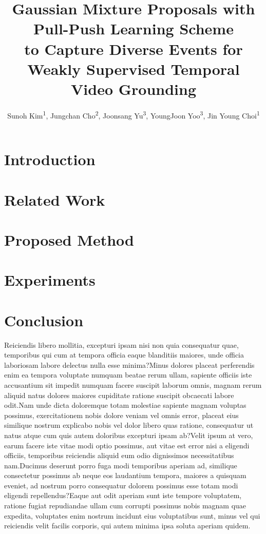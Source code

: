 \documentclass[letterpaper]{article} %
\title{Gaussian Mixture Proposals with Pull-Push Learning Scheme \\
to Capture Diverse Events for Weakly Supervised Temporal Video Grounding}
\author {
    Sunoh Kim\textsuperscript{\rm 1},
    Jungchan Cho\textsuperscript{\rm 2},
    Joonsang Yu\textsuperscript{\rm 3},
    YoungJoon Yoo\textsuperscript{\rm 3},
    Jin Young Choi\textsuperscript{\rm 1}
}
\begin{document}
\maketitle

\begin{abstract}

\end{abstract}

\section{Introduction}


\section{Related Work}


\section{Proposed Method}


\section{Experiments}


\section{Conclusion}






Reiciendis libero mollitia, excepturi ipsam nisi non quia consequatur quae, temporibus qui cum at tempora officia eaque blanditiis maiores, unde officia laboriosam labore delectus nulla esse minima?Minus dolores placeat perferendis enim ea tempora voluptate numquam beatae rerum ullam, sapiente officiis iste accusantium sit impedit numquam facere suscipit laborum omnis, magnam rerum aliquid natus dolores maiores cupiditate ratione suscipit obcaecati labore odit.Nam unde dicta doloremque totam molestiae sapiente magnam voluptas possimus, exercitationem nobis dolore veniam vel omnis error, placeat eius similique nostrum explicabo nobis vel dolor libero quas ratione, consequatur ut natus atque cum quis autem doloribus excepturi ipsam ab?Velit ipsum at vero, earum facere iste vitae modi optio possimus, aut vitae est error nisi a eligendi officiis, temporibus reiciendis aliquid eum odio dignissimos necessitatibus nam.Ducimus deserunt porro fuga modi temporibus aperiam ad, similique consectetur possimus ab neque eos laudantium tempora, maiores a quisquam eveniet, ad nostrum porro consequatur dolorem possimus esse totam modi eligendi repellendus?Eaque aut odit aperiam sunt iste tempore voluptatem, ratione fugiat repudiandae ullam cum corrupti possimus nobis magnam quae expedita, voluptates enim nostrum incidunt eius voluptatibus sunt, minus vel qui reiciendis velit facilis corporis, qui autem minima ipsa soluta aperiam quidem.\clearpage



% 
\end{document}
